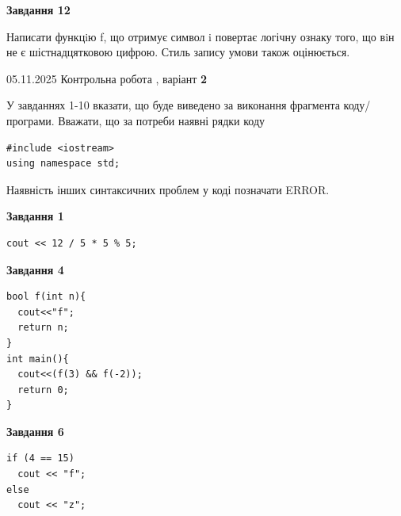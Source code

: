 \documentclass[12pt, ukrainian]{article}
\begin{document}
{\begin {large}
\begin{minipage}[t]{11.0cm}
\begin{center}
\textbf{Завдання 12}
\end{center}

Написати функцiю f, що отримує символ i повертає логічну ознаку того, що вiн не є шістнадцятковою цифрою. Стиль запису умови також оцінюється.\par

\end{minipage}

\end {large}}
\newpage

{\Large{05.11.2025 Контрольна робота , варіант  \No \textbf { 2 }\par}}
{
\begin {large}
У завданнях 1-10 вказати, що буде виведено за виконання фрагмента коду/про\-гра\-ми.
Вважати, що за потреби наявні рядки коду
\begin{verbatim}
#include <iostream>
using namespace std;
\end{verbatim}
Наявність інших синтаксичних проблем у коді позначати ERROR.

\begin{minipage}[t]{7.0cm}

\begin{center}
\textbf{Завдання 1}
\end{center}
\vspace{-8mm}

\begin{verbatim}
cout << 12 / 5 * 5 % 5;
\end{verbatim}



\begin{center}
\textbf{Завдання 4}
\end{center}
\vspace{-8mm}

\begin{verbatim}
bool f(int n){
  cout<<"f";
  return n;
}
int main(){
  cout<<(f(3) && f(-2));
  return 0;
}
\end{verbatim}



\begin{center}
\textbf{Завдання 6}
\end{center}
\vspace{-8mm}

\begin{verbatim}
if (4 == 15)
  cout << "f";
else
  cout << "z";
\end{verbatim}




\end{minipage}
\end{large}}
\end{document}
